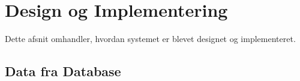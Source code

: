 \chapter{Design og Implementering}
Dette afsnit omhandler, hvordan systemet er blevet designet og implementeret.

\section{Data fra Database}

